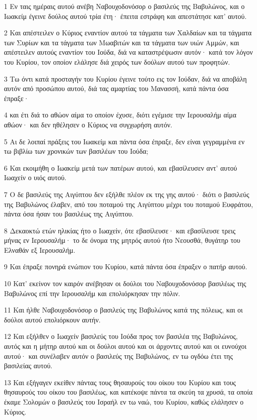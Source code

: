 \par 1 Εν ταις ημέραις αυτού ανέβη Ναβουχοδονόσορ ο βασιλεύς της Βαβυλώνος, και ο Ιωακείμ έγεινε δούλος αυτού τρία έτη· έπειτα εστράφη και απεστάτησε κατ' αυτού.
\par 2 Και απέστειλεν ο Κύριος εναντίον αυτού τα τάγματα των Χαλδαίων και τα τάγματα των Συρίων και τα τάγματα των Μωαβιτών και τα τάγματα των υιών Αμμών, και απέστειλεν αυτούς εναντίον του Ιούδα, διά να καταστρέψωσιν αυτόν· κατά τον λόγον του Κυρίου, τον οποίον ελάλησε διά χειρός των δούλων αυτού των προφητών.
\par 3 Τω όντι κατά προσταγήν του Κυρίου έγεινε τούτο εις τον Ιούδαν, διά να αποβάλη αυτόν από προσώπου αυτού, διά τας αμαρτίας του Μανασσή, κατά πάντα όσα έπραξε·
\par 4 και έτι διά το αθώον αίμα το οποίον έχυσε, διότι εγέμισε την Ιερουσαλήμ αίμα αθώον· και δεν ηθέλησεν ο Κύριος να συγχωρήση αυτόν.
\par 5 Αι δε λοιπαί πράξεις του Ιωακείμ και πάντα όσα έπραξε, δεν είναι γεγραμμένα εν τω βιβλίω των χρονικών των βασιλέων του Ιούδα;
\par 6 Και εκοιμήθη ο Ιωακείμ μετά των πατέρων αυτού, και εβασίλευσεν αντ' αυτού Ιωαχείν ο υιός αυτού.
\par 7 Ο δε βασιλεύς της Αιγύπτου δεν εξήλθε πλέον εκ της γης αυτού· διότι ο βασιλεύς της Βαβυλώνος έλαβεν, από του ποταμού της Αιγύπτου μέχρι του ποταμού Ευφράτου, πάντα όσα ήσαν του βασιλέως της Αιγύπτου.
\par 8 Δεκαοκτώ ετών ηλικίας ήτο ο Ιωαχείν, ότε εβασίλευσε· και εβασίλευσε τρεις μήνας εν Ιερουσαλήμ· το δε όνομα της μητρός αυτού ήτο Νεουσθά, θυγάτηρ του Ελναθάν εξ Ιερουσαλήμ.
\par 9 Και έπραξε πονηρά ενώπιον του Κυρίου, κατά πάντα όσα έπραξεν ο πατήρ αυτού.
\par 10 Κατ' εκείνον τον καιρόν ανέβησαν οι δούλοι του Ναβουχοδονόσορ βασιλέως της Βαβυλώνος επί την Ιερουσαλήμ και επολιόρκησαν την πόλιν.
\par 11 Και ήλθε Ναβουχοδονόσορ ο βασιλεύς της Βαβυλώνος κατά της πόλεως, και οι δούλοι αυτού επολιόρκουν αυτήν.
\par 12 Και εξήλθεν ο Ιωαχείν βασιλεύς του Ιούδα προς τον βασιλέα της Βαβυλώνος, αυτός και η μήτηρ αυτού και οι δούλοι αυτού και οι άρχοντες αυτού και οι ευνούχοι αυτού· και συνέλαβεν αυτόν ο βασιλεύς της Βαβυλώνος, εν τω ογδόω έτει της βασιλείας αυτού.
\par 13 Και εξήγαγεν εκείθεν πάντας τους θησαυρούς του οίκου του Κυρίου και τους θησαυρούς του οίκου του βασιλέως, και κατέκοψε πάντα τα σκεύη τα χρυσά, τα οποία έκαμε Σολομών ο βασιλεύς του Ισραήλ εν τω ναώ, του Κυρίου, καθώς ελάλησεν ο Κύριος.
